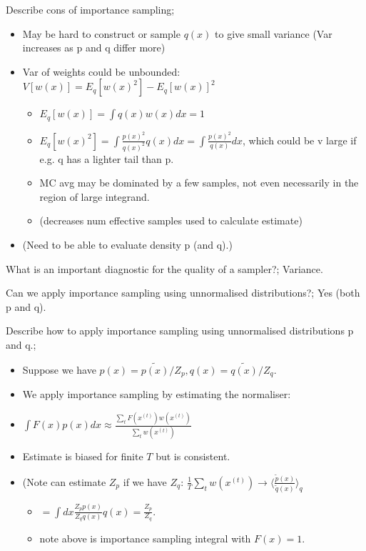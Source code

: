 \documentclass{article}
\begin{document}
Describe cons of importance sampling; \begin{itemize} \item May be hard to construct or sample $q(x)$ to give small variance (Var increases as p and q differ more) \item Var of weights could be unbounded: $V[w(x)] = E_q[w(x)^2] - E_q[w(x)]^2$ \begin{itemize} \item $E_q[w(x)] = \int q(x)w(x)dx = 1$ \item $E_q[w(x)^2] = \int \frac{p(x)^2}{q(x)^2}q(x)dx = \int \frac{p(x)^2}{q(x)}dx$, which could be v large if e.g. q has a lighter tail than p.  \item MC avg may be dominated by a few samples, not even necessarily in the region of large integrand. \item (decreases num effective samples used to calculate estimate) \end{itemize} \item (Need to be able to evaluate density p (and q).) \end{itemize}

What is an important diagnostic for the quality of a sampler?; Variance.

Can we apply importance sampling using unnormalised distributions?; Yes (both p and q).

Describe how to apply importance sampling using unnormalised distributions p and q.; \begin{itemize} \item Suppose we have $p(x) = \tilde{p(x)}/Z_p, q(x) = \tilde{q(x)}/Z_q$. \item We apply importance sampling by estimating the normaliser: \item $\int F(x) p(x) dx \approx \frac{\sum_t F(x^{(t)})w(x^{(t)})}{\sum_t w(x^{(t)})}$ \item Estimate is biased for finite $T$ but is consistent. \item (Note can estimate $Z_p$ if we have $Z_q$: $\frac{1}{T}\sum_t w(x^{(t)})\rightarrow \langle \frac{\tilde{p}(x)}{\tilde{q}(x)}\rangle_q$ \begin{itemize} \item $=\int dx \frac{Z_p p(x)}{Z_q q(x)}q(x) = \frac{Z_p}{Z_q}$. \item note above is importance sampling integral with $F(x) = 1$. \end{itemize} \end{itemize}
\end{document}
